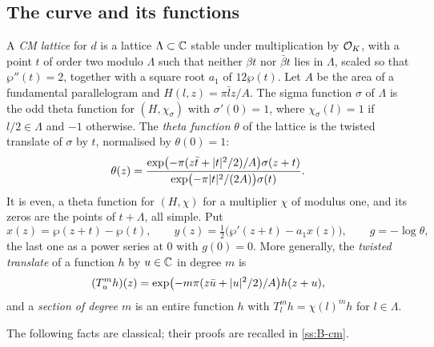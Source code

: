\subsection{The curve and its functions}\label{ss:cm-curve}
A \emph{CM lattice} for $d$ is a lattice $\Lambda\subset\mathbb{C}$ stable under multiplication by $\mathcal{O}_K$,
with a point $t$ of order two modulo $\Lambda$ such that neither $\beta t$ nor $\bar\beta t$ lies in
$\Lambda$, scaled so that $\wp''(t)=2$, together with a square root $a_1$ of $12\wp(t)$. Let $A$ be
the area of a fundamental parallelogram and $H(l,z)=\pi\bar lz/A$. The sigma function $\sigma$ of
$\Lambda$ is the odd theta function for $(H,\chi_\sigma)$ with $\sigma'(0)=1$, where
$\chi_\sigma(l)=1$ if $l/2\in\Lambda$ and $-1$ otherwise. The \emph{theta function} $\theta$ of the
lattice is the twisted translate of $\sigma$ by $t$, normalised by $\theta(0)=1$:
\[
  \theta(z)=\frac{\exp\bigl(-\pi(z\bar t+\lvert t\rvert^2/2)/A\bigr)\sigma(z+t)}
  {\exp\bigl(-\pi\lvert t\rvert^2/(2A)\bigr)\sigma(t)} .
\]
It is even, a theta function for $(H,\chi)$ for a multiplier $\chi$ of modulus one, and its zeros
are the points of $t+\Lambda$, all simple. Put
\[
  x(z)=\wp(z+t)-\wp(t),\qquad y(z)=\tfrac12\bigl(\wp'(z+t)-a_1x(z)\bigr),\qquad g=-\log\theta ,
\]
the last one as a power series at $0$ with $g(0)=0$. More generally, the \emph{twisted translate}
of a function $h$ by $u\in\mathbb{C}$ in degree $m$ is
\[
  (T^m_uh)(z)=\exp\bigl(-m\pi(z\bar u+\lvert u\rvert^2/2)/A\bigr)h(z+u),
\]
and a \emph{section of degree $m$} is an entire function $h$ with $T^m_lh=\chi(l)^mh$ for $l\in\Lambda$.

The following facts are classical; their proofs are recalled in \cref{ss:B-cm}.


